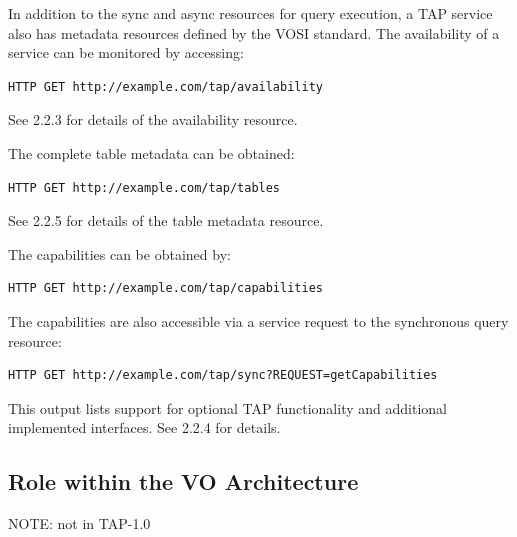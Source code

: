 \documentclass[11pt,a4paper]{ivoa}
\begin{document}
In addition to the sync and async resources for query execution, a TAP service 
also has metadata resources defined by the VOSI standard. The availability of a 
service can be monitored by accessing:

\begin{verbatim}
HTTP GET http://example.com/tap/availability
\end{verbatim}

See 2.2.3 for details of the availability resource.

The complete table metadata can be obtained:

\begin{verbatim}
HTTP GET http://example.com/tap/tables
\end{verbatim}

See 2.2.5 for details of the table metadata resource.

The capabilities can be obtained by:

\begin{verbatim}
HTTP GET http://example.com/tap/capabilities
\end{verbatim}

The capabilities are also accessible via a service request to the synchronous 
query resource:

\begin{verbatim}
HTTP GET http://example.com/tap/sync?REQUEST=getCapabilities
\end{verbatim}

This output lists support for optional TAP functionality and additional 
implemented interfaces. See 2.2.4 for details.


\subsection{Role within the VO Architecture}

NOTE: not in TAP-1.0
\end{document}
